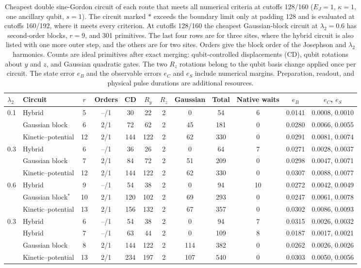 \documentclass[pra,twocolumn,superscriptaddress,nofootinbib,floatfix]{revtex4-2}
\theoremstyle{remark}
\newcommand{\revcolor}{\color{blue}}
\begin{document}
\begin{table}[t]
\revcolor
\caption{Cheapest double sine-Gordon circuit of each route that meets all numerical criteria at cutoffs 128/160 (\(E_J=1\), \(\kappa=1\), one ancillary qubit, \(s=1\)). The circuit marked \(\ast\) exceeds the boundary limit only at padding 128 and is evaluated at cutoffs 160/192, where it meets every criterion. At cutoffs 128/160 the cheapest Gaussian-block circuit at \(\lambda_2=0.6\) has second-order blocks, \(r=9\), and 301 primitives. The last four rows are for three sites, where the hybrid circuit is also listed with one more outer step, and the others are for two sites. Orders give the block order of the Josephson and \(\lambda_2\) harmonics. Counts are ideal primitives after exact merging: qubit-controlled displacements (CD), qubit rotations about \(y\) and \(z\), and Gaussian quadratic gates. The two \(R_z\) rotations belong to the qubit basis change applied once per circuit. The state error \(e_B\) and the observable errors \(e_C\) and \(e_S\) include numerical margins. Preparation, readout, and physical pulse durations are additional resources.}
\label{tab:dsg-resources}
\begin{ruledtabular}
\begin{tabular}{llcccccccccc}
\(\lambda_2\) & Circuit & \(r\) & Orders & CD & \(R_y\) & \(R_z\) & Gaussian & Total & Native waits & \(e_B\) & \(e_C\), \(e_S\) \\
\hline
0.1 & Hybrid & 5 & --/1 & 30 & 22 & 2 & 0 & 54 & 6 & 0.0141 & 0.0008, 0.0010 \\
  & Gaussian block & 6 & 2/1 & 72 & 62 & 2 & 45 & 181 & 0 & 0.0280 & 0.0066, 0.0055 \\
  & Kinetic--potential & 12 & 2/1 & 144 & 122 & 2 & 62 & 330 & 0 & 0.0291 & 0.0081, 0.0074 \\
0.3 & Hybrid & 6 & --/1 & 36 & 26 & 2 & 0 & 64 & 7 & 0.0271 & 0.0028, 0.0037 \\
  & Gaussian block & 7 & 2/1 & 84 & 72 & 2 & 51 & 209 & 0 & 0.0298 & 0.0047, 0.0071 \\
  & Kinetic--potential & 12 & 2/1 & 144 & 122 & 2 & 62 & 330 & 0 & 0.0307 & 0.0088, 0.0077 \\
0.6 & Hybrid & 9 & --/1 & 54 & 38 & 2 & 0 & 94 & 10 & 0.0272 & 0.0042, 0.0049 \\
  & Gaussian block\(^\ast\) & 10 & 2/1 & 120 & 102 & 2 & 69 & 293 & 0 & 0.0247 & 0.0061, 0.0078 \\
  & Kinetic--potential & 13 & 2/1 & 156 & 132 & 2 & 67 & 357 & 0 & 0.0302 & 0.0086, 0.0093 \\
\hline
0.3 & Hybrid & 6 & --/1 & 54 & 38 & 2 & 0 & 94 & 7 & 0.0315 & 0.0026, 0.0032 \\
  & Hybrid & 7 & --/1 & 63 & 44 & 2 & 0 & 109 & 8 & 0.0187 & 0.0017, 0.0021 \\
  & Gaussian block & 8 & 2/1 & 144 & 122 & 2 & 114 & 382 & 0 & 0.0262 & 0.0026, 0.0026 \\
  & Kinetic--potential & 13 & 2/1 & 234 & 197 & 2 & 107 & 540 & 0 & 0.0303 & 0.0050, 0.0056 \\
\end{tabular}
\end{ruledtabular}
\end{table}
\end{document}
